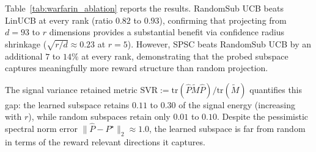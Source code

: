 \documentclass{article}
\newcommand{\tr}{\mathrm{tr}}
\begin{document}
{  Table~\ref{tab:warfarin_ablation} reports the results.
  RandomSub UCB beats LinUCB at every rank (ratio $0.82$ to $0.93$), confirming that
  projecting from $d{=}93$ to $r$ dimensions provides a substantial benefit via
  confidence radius shrinkage ($\sqrt{r/d} \approx 0.23$ at $r{=}5$).
  However, SPSC beats RandomSub UCB by an additional $7$ to $14\%$ at every rank,
  demonstrating that the probed subspace captures meaningfully more reward structure
  than random projection.

  The signal variance retained metric
  $\mathrm{SVR} := \tr(\widehat P \widetilde M \widehat P) / \tr(\widetilde M)$
  quantifies this gap: the learned subspace retains $0.11$ to $0.30$ of the signal energy
  (increasing with $r$), while random subspaces retain only $0.01$ to $0.10$.
  Despite the pessimistic spectral norm error $\|\widehat P - P^\star\|_2 \approx 1.0$,
  the learned subspace is far from random in terms of the reward relevant directions it captures.

}
\end{document}
